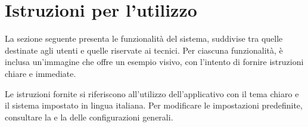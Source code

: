 \section{Istruzioni per l'utilizzo}

\par La sezione seguente presenta le funzionalità del sistema, suddivise tra quelle destinate agli utenti e quelle riservate ai tecnici. Per ciascuna funzionalità, è inclusa un'immagine che offre un esempio visivo, con l'intento di fornire istruzioni chiare e immediate.

\par Le istruzioni fornite si riferiscono all'utilizzo dell'applicativo con il tema chiaro e il sistema impostato in lingua italiana. Per modificare le impostazioni predefinite, consultare la  e la  delle configurazioni generali.







